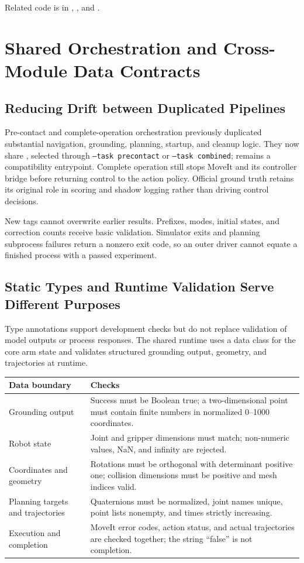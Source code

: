Related code is in , , and .

\section{Shared Orchestration and Cross-Module Data Contracts}
\subsection{Reducing Drift between Duplicated Pipelines}
Pre-contact and complete-operation orchestration previously duplicated substantial navigation, grounding, planning, startup, and cleanup logic. They now share , selected through \texttt{--task precontact} or \texttt{--task combined};  remains a compatibility entrypoint. Complete operation still stops MoveIt and its controller bridge before returning control to the action policy. Official ground truth retains its original role in scoring and shadow logging rather than driving control decisions.

New tags cannot overwrite earlier results. Prefixes, modes, initial states, and correction counts receive basic validation. Simulator exits and planning subprocess failures return a nonzero exit code, so an outer driver cannot equate a finished process with a passed experiment.

\subsection{Static Types and Runtime Validation Serve Different Purposes}
Type annotations support development checks but do not replace validation of model outputs or process responses. The shared runtime uses a data class for the core arm state and validates structured grounding output, geometry, and trajectories at runtime.

\begin{longtable}{p{.23\linewidth}p{.66\linewidth}}
\toprule Data boundary & Checks\\\midrule\endhead
Grounding output & Success must be Boolean true; a two-dimensional point must contain finite numbers in normalized 0--1000 coordinates.\\
Robot state & Joint and gripper dimensions must match; non-numeric values, NaN, and infinity are rejected.\\
Coordinates and geometry & Rotations must be orthogonal with determinant positive one; collision dimensions must be positive and mesh indices valid.\\
Planning targets and trajectories & Quaternions must be normalized, joint names unique, point lists nonempty, and times strictly increasing.\\
Execution and completion & MoveIt error codes, action status, and actual trajectories are checked together; the string ``false'' is not completion.\\
\bottomrule\end{longtable}

